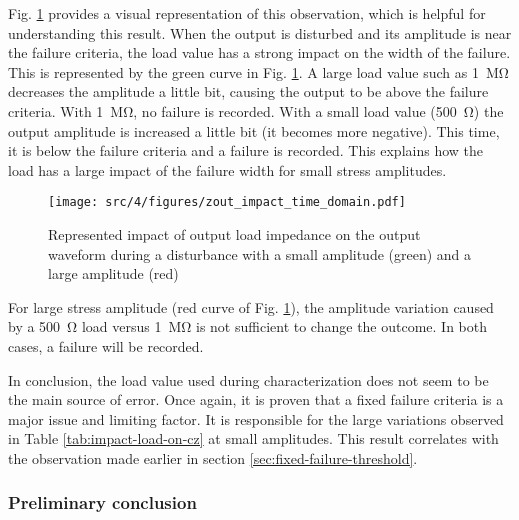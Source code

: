 Fig. \ref{fig:impact-time-domain-load} provides a visual representation of this observation, which is helpful for understanding this result.
When the output is disturbed and its amplitude is near the failure criteria, the load value has a strong impact on the width of the failure.
This is represented by the green curve in Fig. \ref{fig:impact-time-domain-load}.
A large load value such as \SI{1}{\mega\ohm} decreases the amplitude a little bit, causing the output to be above the failure criteria.
With \SI{1}{\mega\ohm}, no failure is recorded.
With a small load value (\SI{500}{\ohm}) the output amplitude is increased a little bit (it becomes more negative).
This time, it is below the failure criteria and a failure is recorded.
This explains how the load has a large impact of the failure width for small stress amplitudes.

\begin{figure}[!h]
  \centering
  \texttt{[image: src/4/figures/zout\_impact\_time\_domain.pdf]}
  \caption{Represented impact of output load impedance on the output waveform during a disturbance with a small amplitude (green) and a large amplitude (red)}
  \label{fig:impact-time-domain-load}
\end{figure}

For large stress amplitude (red curve of Fig. \ref{fig:impact-time-domain-load}), the amplitude variation caused by a \SI{500}{\ohm} load versus \SI{1}{\mega\ohm} is not sufficient to change the outcome.
In both cases, a failure will be recorded.

In conclusion, the load value used during characterization does not seem to be the main source of error.
Once again, it is proven that a fixed failure criteria is a major issue and limiting factor.
It is responsible for the large variations observed in Table \ref{tab:impact-load-on-cz} at small amplitudes.
This result correlates with the observation made earlier in section \ref{sec:fixed-failure-threshold}.

\subsubsection{Preliminary conclusion}

